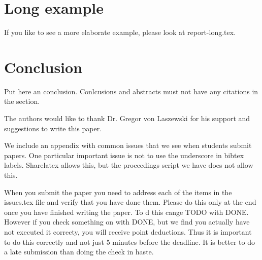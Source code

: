 \documentclass[sigconf]{acmart}
\begin{document}
\section{Long example}

If you like to see a more elaborate example, please look at
report-long.tex. 

\section{Conclusion}

Put here an conclusion. Conlcusions and abstracts must not have any
citations in the section.


\begin{acks}

  The authors would like to thank Dr. Gregor von Laszewski for his
  support and suggestions to write this paper.

\end{acks}


 

\appendix

We include an appendix with common issues that we see when students
submit papers. One particular important issue is not to use the
underscore in bibtex labels. Sharelatex allows this, but the
proceedings script we have does not allow this.

When you submit the paper you need to address each of the items in the
issues.tex file and verify that you have done them. Please do this
only at the end once you have finished writing the paper. To d this
cange TODO with DONE. However if you check something on with DONE, but
we find you actually have not executed it correcty, you will receive
point deductions. Thus it is important to do this correctly and not
just 5 minutes before the deadline. It is better to do a late
submission than doing the check in haste. 


\end{document}
